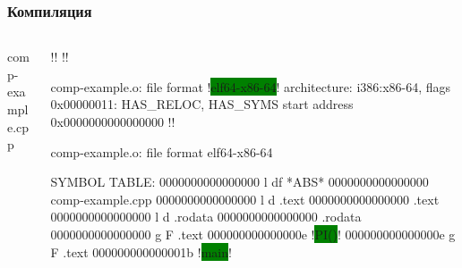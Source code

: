 \documentclass[compress]{beamer}
\begin{document}
\begin{frame}[fragile]

    \frametitle{Компиляция}

    \begin{columns}[T]

        \begin{column}{0.25\textwidth}

                {comp-example.cpp}

        \end{column}

        \begin{column}{0.75\textwidth}

            \begin{terminalwindow}
!!
!!

comp-example.o:     file format !\colorbox{green}{elf64-x86-64}!
architecture: i386:x86-64, flags 0x00000011:
HAS_RELOC, HAS_SYMS
start address 0x0000000000000000
!!

comp-example.o:     file format elf64-x86-64

SYMBOL TABLE:
0000000000000000 l    df *ABS*  0000000000000000 comp-example.cpp
0000000000000000 l    d  .text  0000000000000000 .text
0000000000000000 l    d  .rodata        0000000000000000 .rodata
0000000000000000 g     F .text  000000000000000e !\colorbox{green}{PI()}!
000000000000000e g     F .text  000000000000001b !\colorbox{green}{main}!
            \end{terminalwindow}

        \end{column}

    \end{columns}

\end{frame}
\end{document}
